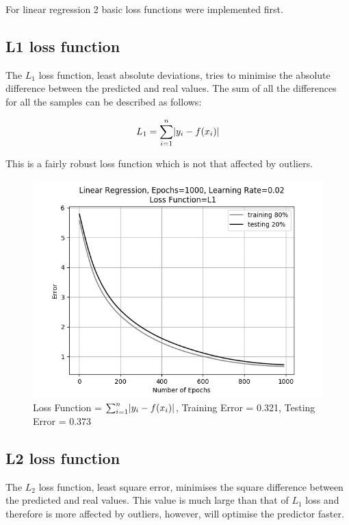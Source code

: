 \documentclass[10pt,twocolumn,letterpaper]{article}
\DeclarePairedDelimiter\abs{\lvert}{\rvert}%
\begin{document}
For linear regression 2 basic loss functions were implemented first.

\subsection{L1 loss function}
The $L_1$ loss function, least absolute deviations, tries to minimise the absolute difference between the predicted and real values. The sum of all the differences for all the samples can be described as follows:

\begin{equation}
L_1 = \sum_{i = 1}^{n} \abs{y_i - f(x_i)}
\end{equation}

This is a fairly robust loss function which is not that affected by outliers.

\begin{figure}[h]
	\begin{center}
		\includegraphics[width=0.9\linewidth]{img/l1loss.png}
	\end{center}
	\caption{Loss Function = $\sum_{i = 1}^{n} \abs{y_i - f(x_i)}$, Training Error = 0.321, Testing Error = 0.373}
	\label{fig:l1loss}
\end{figure}

\subsection{L2 loss function}
The $L_2$ loss function, least square error, minimises the square difference between the predicted and real values. This value is much large than that of $L_1$ loss and therefore is more affected by outliers, however, will optimise the predictor faster.
\end{document}
